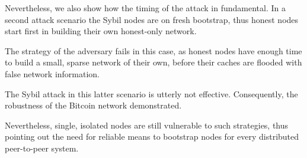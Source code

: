 Nevertheless, we also show how the timing of the attack in fundamental. In a second attack scenario the Sybil nodes are on fresh bootstrap, thus honest nodes start first in building their own honest-only network.

The strategy of the adversary fails in this case, as honest nodes have enough time to build a small, sparse network of their own, before their caches are flooded with false network information.

The Sybil attack in this latter scenario is utterly not effective. Consequently, the robustness of the Bitcoin network demonstrated.

Nevertheless, single, isolated nodes are still vulnerable to such strategies, thus pointing out the need for reliable means to bootstrap nodes for every distributed peer-to-peer system.




